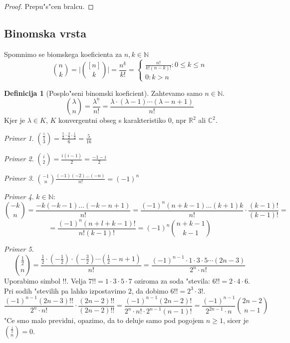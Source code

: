 \documentclass[a4paper,12pt]{article}
\theoremstyle{definition}
\newtheorem{defn}[counter]{Definicija}
\theoremstyle{remark}
\newtheorem*{ex}{Primer}
\newcommand{\N}{\mathbb{N}}
\newcommand{\R}{\mathbb{R}}
\newcommand{\C}{\mathbb{C}}
\begin{document}
\begin{proof}
    Prepu"s"cen bralcu.
\end{proof}


\subsection{Binomska vrsta}
Spomnimo se biomskega koeficienta za $n, k \in \N$
\[\binom{n}{k} = \bigg|\binom{[n]}{k}\bigg| = \frac{n^{\underline{k}}}{k!} = \begin{cases}\frac{n!}{k!(n-k)!}: 0 \leqslant k \leqslant n \\ 0: k > n\end{cases}\] %
\begin{defn}[Posplo"seni binomski koeficient]
	Zahtevamo samo $n \in \N$.
	\[\binom{\lambda}{n} = \frac{\lambda^{\underline{n}}}{n!} = \frac{\lambda \cdot (\lambda - 1) \cdots (\lambda - n + 1)}{n!}\]
	Kjer je $\lambda \in K$, $K$ konvergentni obseg s karakteristiko $0$, npr $\R^2$ ali $\C^2$.
\end{defn}
\begin{ex}
	$\binom{\frac{5}{2}}{3} = \frac{\frac{5}{2} \cdot \frac{3}{2} \cdot \frac{1}{2}}{6} = \frac{5}{16}$
\end{ex}
\begin{ex}
	$\binom{i}{2} = \frac{i (i - 1)}{2} = \frac{-1 -i}{2}$
\end{ex}
\begin{ex}
	$\binom{-1}{n} \frac{(-1)(-2)...(-n)}{n!} = (-1)^n$
\end{ex}
\begin{ex}
	$k \in \N$:
	\[\binom{-k}{n} = \frac{-k (-k - 1) ... (-k - n + 1)}{n!} = \frac{(-1)^n (n + k - 1) ... (k + 1) k}{n!} \cdot \frac{(k - 1)!}{(k - 1)!} = \]
	\[ = \frac{(-1)^n (n+l+k-1)!}{n! (k - 1)!} = (-1)^n \binom{n + k - 1}{k - 1}\]
\end{ex}
\begin{ex}
	\[\binom{\frac{1}{2}}{n} = \frac{\frac{1}{2}\cdot(-\frac{1}{2})\cdot(-\frac{3}{2})\cdots(\frac{1}{2}-n+1)}{n!}=\frac{(-1)^{n-1}\cdot1\cdot3\cdot5\cdots(2n-3)}{2^n\cdot n!}\]
	Uporabimo simbol $!!$. Velja $7!! = 1\cdot3\cdot5\cdot7$ oziroma za soda "stevila: $6!! = 2\cdot4\cdot6$. Pri sodih "stevilih pa lahko izpostavimo $2$, da dobimo $6!! = 2^3 \cdot 3!$.
	\[\frac{(-1)^{n-1}(2n-3)!!}{2^n\cdot n!}\cdot\frac{(2n-2)!!}{(2n-2)!!} =
	\frac{(-1)^{n-1}(2n-2)!}{2^n \cdot n!\cdot 2^{n-1}(n-1)!} = \frac{(-1)^{n-1}}{2^{2n-1}\cdot n}\binom{2n-2}{n-1}\]
	"Ce smo malo previdni, opazimo, da to deluje samo pod pogojem $n \geqslant 1$, sicer je $\binom{\frac{1}{2}}{n} = 0$.
\end{ex}
\end{document}
